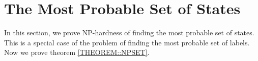 \section{The Most Probable Set of States}
\label{sec:set}
In this section, we prove NP-hardness of finding the most probable set
of states. This is a special case of the
problem of finding the most probable set of labels. Now we prove theorem
\ref{THEOREM::NPSET}.


